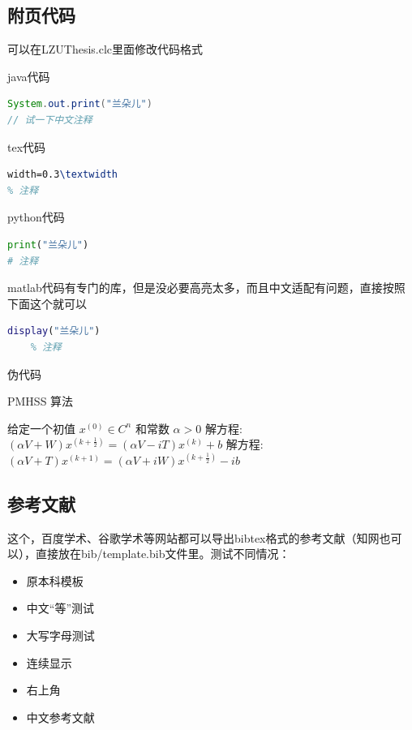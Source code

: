 \documentclass[AutoFakeBold]{LZUThesis}
\begin{document}
\subsection{附页代码} %
\label{sub:附页代码}
可以在LZUThesis.clc里面修改代码格式

java代码
\begin{lstlisting}[language = java]
System.out.print("兰朵儿")
// 试一下中文注释
\end{lstlisting}


tex代码
\begin{lstlisting}[language = tex]
width=0.3\textwidth
% 注释
\end{lstlisting}

python代码
\begin{lstlisting}[language = python]
print("兰朵儿")
# 注释
\end{lstlisting}

matlab代码有专门的库，但是没必要高亮太多，而且中文适配有问题，直接按照下面这个就可以
\begin{lstlisting}[language = matlab]
    display("兰朵儿")
    % 注释
\end{lstlisting}


伪代码

\begin{algorithm}[H]
    \caption{PMHSS 算法\label{Alg:PMHSS}}
    \begin{algorithmic}[1]
        \State 给定一个初值 $ x^{(0)} \in C^{n} $  和常数 $\alpha>0$
        \State 解方程: $(\alpha V+W)x^{(k+\frac{1}{2})}=(\alpha V-i T)x^{(k)}+b $
        \State 解方程: $(\alpha V+T)x^{(k+1)}=(\alpha V+i W)x^{(k+\frac{1}{2})}-i b$
        \EndFor
    \end{algorithmic}
\end{algorithm}

\subsection{参考文献} %
\label{sub:参考文献}

这个，百度学术、谷歌学术等网站都可以导出bibtex格式的参考文献（知网也可以），直接放在bib/template.bib文件里。测试不同情况：

\begin{itemize}
    \item 原本科模板
    \item 中文“等”测试\cite{JHXY202209006}
    \item 大写字母测试\cite{PhysRevLett.108.024101}
    \item 连续显示\cite{kim-2014-convolutional,CN114818809B,1015728912.nh}
    \item 右上角
    \item 中文参考文献 \cite{李刚2006基于动态光谱的脉搏血氧测量精度分析}
\end{itemize}
\end{document}
